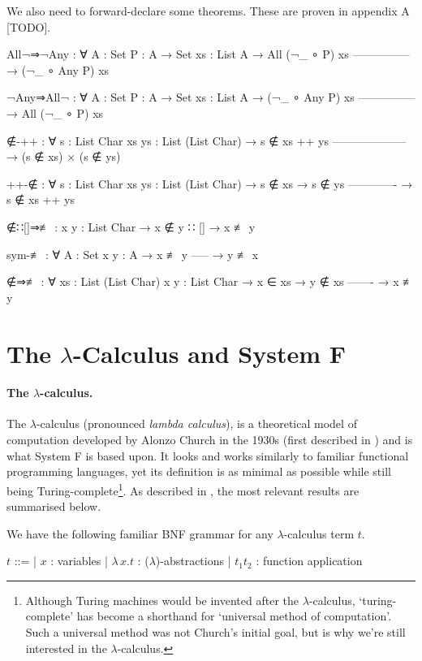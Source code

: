 \documentclass[logo,bsc,singlespacing,parskip,online]{infthesis}
\renewenvironment{code}{\mintedcopy[breaklines,breaksymbolleft=\;]{agda}}{\endmintedcopy}
\begin{document}
We also need to forward-declare some theorems. These are proven in appendix A [TODO].

\begin{code}
All¬⇒¬Any : ∀ {A : Set} {P : A → Set} {xs : List A}
  → All (¬_ ∘ P) xs
    ---------------
  → (¬_ ∘ Any P) xs

¬Any⇒All¬ : ∀ {A : Set} {P : A → Set} {xs : List A}
  → (¬_ ∘ Any P) xs
    ---------------
  → All (¬_ ∘ P) xs

∉-++ : ∀ {s : List Char} {xs ys : List (List Char)}
  → s ∉ xs ++ ys
    --------------------
  → (s ∉ xs) × (s ∉ ys)

++-∉ : ∀ {s : List Char} {xs ys : List (List Char)}
  → s ∉ xs
  → s ∉ ys
    -------------
  → s ∉ xs ++ ys

∉∷[]⇒≢ : {x y : List Char} → x ∉ y ∷ [] → x ≢ y

sym-≢ : ∀ {A : Set} {x y : A}
  → x ≢ y
    -----
  → y ≢ x

∉⇒≢ : ∀ {xs : List (List Char)} {x y : List Char}
  → x ∈ xs
  → y ∉ xs
    -------
  → x ≢ y

\end{code}

\section{The $\lambda$-Calculus and System F}

\paragraph*{The $\lambda$-calculus.} The $\lambda$-calculus (pronounced
\textit{lambda calculus}), is a theoretical model of computation developed by
Alonzo Church in the 1930s (first described in \citet{church_set_1932}) and is
what System F is based upon. It looks and works similarly to familiar functional
programming languages, yet its definition is as minimal as possible while still
being Turing-complete\footnote{Although Turing machines would be invented after
the $\lambda$-calculus, `turing-complete' has become a shorthand for `universal
method of computation'. Such a universal method was not Church's initial goal,
but is why we're still interested in the $\lambda$-calculus.}. As described in
\cite{pierce_types_2002}, the most relevant results are summarised below.

We have the following familiar BNF grammar for any $\lambda$-calculus term $t$.

\begin{center}
\begin{bnf}
  $t$ ::=
  | $x$ : variables
  | $\lambda \, x. t$ : ($\lambda$)-abstractions
  | $t_1 t_2$ : function application
\end{bnf}
\end{center}
\end{document}
